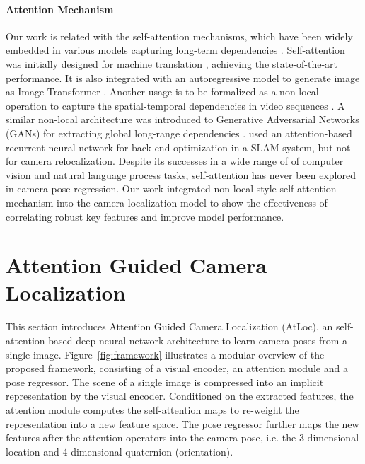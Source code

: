 \documentclass[letterpaper]{article}
\begin{document}
\paragraph{Attention Mechanism}
Our work is related with the self-attention mechanisms, which have been widely embedded in various models capturing long-term dependencies \cite{bahdanau2014neural,xu2015show,yang2019context}. 
Self-attention was initially designed for machine translation \cite{vaswani2017attention,dou2019dynamic,cheng2016long}, achieving the state-of-the-art performance. It is also integrated with an autoregressive model to generate image as Image Transformer \cite{parmar2018image,kingma2018glow}. Another usage is to be formalized as a non-local operation to capture the spatial-temporal dependencies in video sequences \cite{wang2018non,yuan2019find}. 
A similar non-local architecture was introduced to Generative Adversarial Networks (GANs) for extracting global long-range dependencies \cite{zhang2018self,liu2019perceptual}. 
\cite{parisotto2018global} used an attention-based recurrent neural network for back-end optimization in a SLAM system, but not for camera relocalization.
Despite its successes in a wide range of of computer vision \cite{fu2019sta,chen2019selective} and natural language process tasks, self-attention has never been explored in camera pose regression. 
Our work integrated non-local style self-attention mechanism into the camera localization model to show the effectiveness of correlating robust key features and improve model performance.

\section{Attention Guided Camera Localization}
This section introduces Attention Guided Camera Localization (AtLoc), an self-attention based deep neural network architecture to learn camera poses from a single image. 
Figure~\ref{fig:framework} illustrates a modular overview of the proposed framework, consisting of a visual encoder, an attention module and a pose regressor. 
The scene of a single image is compressed into an implicit representation by the visual encoder.
Conditioned on the extracted features, the attention module computes the self-attention maps to re-weight the representation into a new feature space.
The pose regressor further maps the new features after the attention operators into the camera pose, i.e. the 3-dimensional location and 4-dimensional quaternion (orientation).
\end{document}
